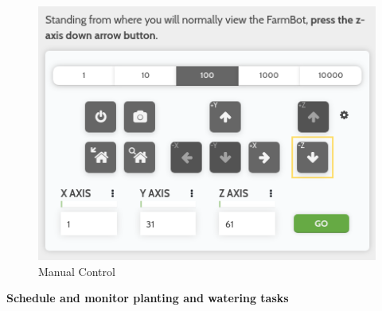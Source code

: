 \begin{itemize}
    \begin{figure}[H]
        \centering
        \includegraphics[width=0.6\linewidth]{Figures/ui_mancont.png}
        \caption{Manual Control}
        \label{fig:ui_control}
    \end{figure}

    
    \textbf{Schedule and monitor planting and watering tasks}


\end{itemize}
